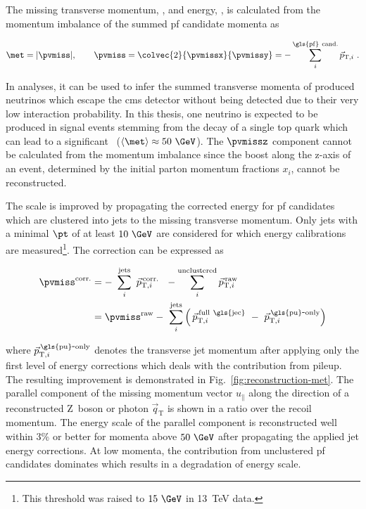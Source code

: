 The missing transverse momentum, \pvmiss, and energy, \met, is calculated from the momentum imbalance of the summed \gls{pf} candidate momenta as

\begin{equation}
\met=|\pvmiss|,\qquad \pvmiss=\colvec{2}{\pvmissx}{\pvmissy}=-\sum_{i}^\mathrm{\gls{pf}~cand.}\vec{p}_{\mathrm{T},i}~.
\end{equation}

In analyses, it can be used to infer the summed transverse momenta of produced neutrinos which escape the \gls{cms} detector without being detected due to their very low interaction probability. In this thesis, one neutrino is expected to be produced in signal events stemming from the decay of a single top quark which can lead to a significant \met~($\langle\met\rangle\approx50~\GeV$). The $\pvmissz$ component cannot be calculated from the momentum imbalance since the boost along the z-axis of an event, determined by the initial parton momentum fractions $x_i$, cannot be reconstructed.

The \met scale is improved by propagating the corrected energy for \gls{pf} candidates which are clustered into jets to the missing transverse momentum. Only jets with a minimal $\pt$ of at least $10~\GeV$ are considered for which energy calibrations are measured\footnote{This threshold was raised to $15~\GeV$ in 13~TeV data.}. The correction can be expressed as

\begin{align}
\pvmiss^\mathrm{corr.}&=-~\sum_{i}^\mathrm{jets}~\vec{p}_{\mathrm{T},i}^\mathrm{\,corr.}~~-\sum_{i}^\mathrm{unclustered}\vec{p}_{\mathrm{T},i}^\mathrm{\,raw}\\
&=\pvmiss^\mathrm{raw}-~\sum_{i}^\mathrm{jets}\left(\, \vec{p}_{\mathrm{T},i}^\mathrm{\,full~\gls{jec}}~-~\vec{p}_{\mathrm{T},i}^\mathrm{\,\gls{pu}\mbox{-}only}\right)
\end{align}

where $\vec{p}_{\mathrm{T},i}^\mathrm{\,\gls{pu}\mbox{-}only}$ denotes the transverse jet momentum after applying only the first level of energy corrections which deals with the contribution from pileup. The resulting improvement is demonstrated in Fig.~\ref{fig:reconstruction-met}. The parallel component of the missing momentum vector $u_{\parallel}$ along the direction of a reconstructed $\mathrm{Z}$~boson or photon $\vec{q}_\mathrm{T}$ is shown in a ratio over the recoil momentum. The energy scale of the parallel \pvmiss component is reconstructed well within 3\% or better for momenta above $50~\GeV$ after propagating the applied jet energy corrections. At low momenta, the contribution from unclustered \gls{pf} candidates dominates which results in a degradation of energy scale.

